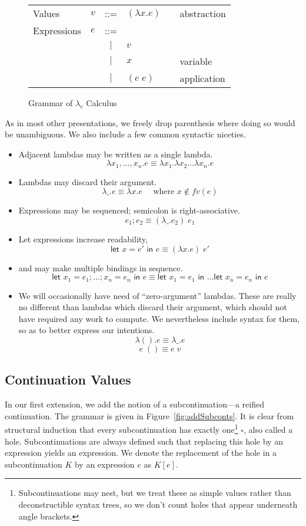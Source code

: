 \documentclass[11pt]{article}
\newcommand{\maybePage}{\newpage}
\newcommand\x{\lambda x}
\newcommand{\letin}[2]{\textsf{let }#1\textsf{ in }#2}
\begin{document}
\begin{figure}[H]
\caption{Grammar of $\lambda_v$ Calculus}
\label{fig:lambdaCalculus}

\begin{tabular}{llclll}
Values & $v$ & ::= & $(\lambda x.e)$ && abstraction\\
Expressions & $e$ & ::= & \\
& & $|$ & $v$ && \\
& & $|$ & $x$ && variable \\
& & $|$ & $(e\;e)$ && application \\
\end{tabular}
\end{figure}


As in most other presentations, we freely drop parenthesis where doing so would be unambiguous.
We also include a few common syntactic niceties.
\begin{itemize}
\item Adjacent lambdas may be written as a single lambda.
	$$\x_1,\ldots,x_n.e \equiv \x_1.\x_2\ldots\x_n.e$$
\item Lambdas may discard their argument.
	$$\lambda\_.e \equiv \x.e \quad\textrm{ where }x \notin fv(e)$$
\item Expressions may be sequenced; semicolon is right-associative.
	$$e_1; e_2 \equiv (\lambda\_.e_2)\;e_1$$
\item Let expressions increase readability,
	$$\letin{x = e'}{e} \equiv (\x.e)\;e'$$
\item and may make multiple bindings in sequence.
	$$\letin{x_1 = e_1; \ldots; x_n = e_n}{e} \equiv \letin{x_1 = e_1}{\ldots\letin{x_n = e_n}{e}}$$
\item We will occasionally have need of ``zero-argument'' lambdas.
These are really no different than lambdas which discard their argument, which should not have required any work to compute.
We nevertheless include syntax for them, so as to better express our intentions.
	$$\lambda().e \equiv \lambda\_.e$$
	$$e\;() \equiv e\;v$$
\end{itemize}


\maybePage
\subsection{Continuation Values}

In our first extension, we add the notion of a subcontinuation---a reified continuation.
The grammar is given in Figure~\ref{fig:addSubconts}.
It is clear from structural induction that every subcontinuation has exactly one\footnote{Subcontinuations may nest, but we treat these as simple values rather than deconstructible syntax trees, so we don't count holes that appear underneath angle brackets.} $\square$, also called a hole.
Subcontinuations are always defined such that replacing this hole by an expression yields an expression.
We denote the replacement of the hole in a subcontinuation $K$ by an expression $e$ as $K[e]$.
\end{document}
